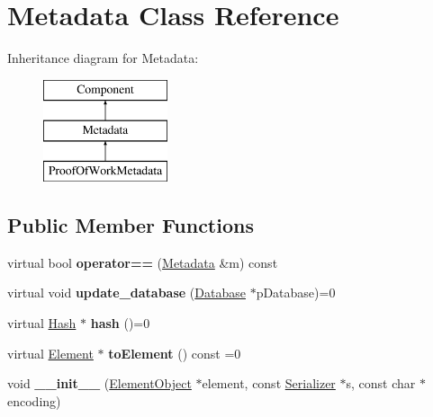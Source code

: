 \hypertarget{classMetadata}{}\section{Metadata Class Reference}
\label{classMetadata}
Inheritance diagram for Metadata\+:\begin{figure}[H]
\begin{center}
\leavevmode
\includegraphics[height=3.000000cm]{classMetadata}
\end{center}
\end{figure}
\subsection*{Public Member Functions}
\begin{DoxyCompactItemize}
\item 
\mbox{\label{classMetadata_a2721356452a5d366d58275dd1fc1209c}} 
virtual bool {\bfseries operator==} (\mbox{\hyperlink{classMetadata}{Metadata}} \&m) const
\item 
\mbox{\label{classMetadata_aa0ee5e6a7020e02b67b2b95b6bc2a70b}} 
virtual void {\bfseries update\+\_\+database} (\mbox{\hyperlink{classDatabase}{Database}} $\ast$p\+Database)=0
\item 
\mbox{\label{classMetadata_a893b85a8fe38060c72bdda20818a7334}} 
virtual \mbox{\hyperlink{classHash}{Hash}} $\ast$ {\bfseries hash} ()=0
\item 
\mbox{\label{classComponent_a3e63d8c993e417a4af3f56d65ebfc7ea}} 
virtual \mbox{\hyperlink{classElement}{Element}} $\ast$ {\bfseries to\+Element} () const =0
\item 
\mbox{\label{classComponent_a28212595f8ee85fe009bd233bc99b2fc}} 
void {\bfseries \+\_\+\+\_\+init\+\_\+\+\_\+} (\mbox{\hyperlink{classElementObject}{Element\+Object}} $\ast$element, const \mbox{\hyperlink{classSerializer}{Serializer}} $\ast$s, const char $\ast$encoding)
\end{DoxyCompactItemize}
